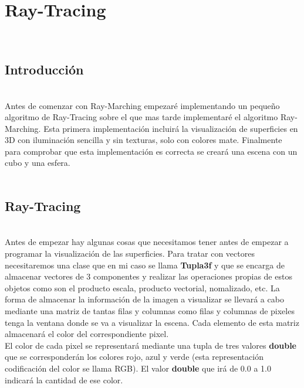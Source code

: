 \chapter{Ray-Tracing}

${ }$\\
\section{Introducción}
${ }$\\

Antes de comenzar con Ray-Marching empezaré implementando un pequeño algoritmo de Ray-Tracing sobre el que mas tarde implementaré el algoritmo Ray-Marching. Esta primera implementación incluirá la visualización de superficies en 3D con iluminación sencilla y sin texturas, solo con colores mate. Finalmente para comprobar que esta implementación es correcta se creará una escena con un cubo y una esfera.
${ }$\\

${ }$\\
\section{Ray-Tracing}
${ }$\\

Antes de empezar hay algunas cosas que necesitamos tener antes de empezar a programar la visualización de las superficies. Para tratar con vectores necesitaremos una clase que en mi caso se llama \textbf{Tupla3f} y que se encarga de almacenar vectores de 3 componentes y realizar las operaciones propias de estos objetos como son el producto escala, producto vectorial, nomalizado, etc. La forma de almacenar la información de la imagen a visualizar se llevará a cabo mediante una matriz de tantas filas y columnas como filas y columnas de pixeles tenga la ventana donde se va a visualizar la escena. Cada elemento de esta matriz almacenará el color del correspondiente pixel.
	${ }$\\	
	
El color de cada pixel se representará mediante una tupla de tres valores \textbf{double} que se corresponderán los colores rojo, azul y verde (esta representación codificación del color se llama RGB). El valor \textbf{double} que irá de 0.0 a 1.0 indicará la cantidad de ese color.
	${ }$\\	
	
